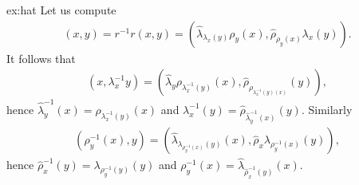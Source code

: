 \begin{sol}{ex:hat}
    Let us compute
    \begin{align*}
        (x,y)=r^{-1}r(x,y) = (\hat{\lambda}_{\lambda_x(y)}\rho_y(x),\hat{\rho}_{\rho_y(x)}\lambda_x(y)).
    \end{align*}
    It follows that 
    \begin{align*}
        (x,\lambda^{-1}_x{y})=(\hat{\lambda}_y\rho_{\lambda^{-1}_x(y)}(x),\hat{\rho}_{\rho_{\lambda^{-1}_x(y)(x)}}(y)),
    \end{align*}
    hence $\hat{\lambda}^{-1}_y(x)=\rho_{\lambda^{-1}_x(y)}(x)$ and $\lambda^{-1}_x(y)=\hat{\rho}_{\hat{\lambda}^{-1}_y(x)}(y)$. Similarly
    \begin{align*}
        ({\rho^{-1}_y(x)},y)=(\hat{\lambda}_{\lambda_{\rho^{-1}_y(x)}(y)}(x),\hat{\rho}_{x}\lambda_{\rho^{-1}_y(x)}(y)),
    \end{align*}
    hence $\hat{\rho}^{-1}_x(y)=\lambda_{\rho^{-1}_y(y)}(y)$ and $\rho^{-1}_y(x) = \hat{\lambda}_{\hat{\rho}^{-1}_x(y)}(x)$.
\end{sol}